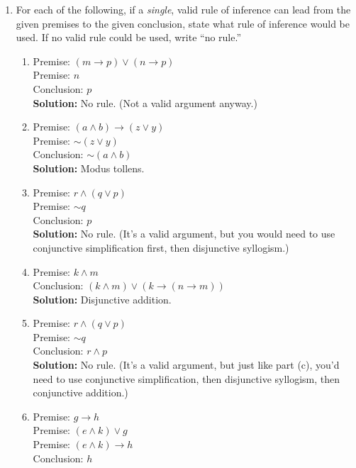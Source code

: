 \documentclass[12pt, letterpaper]{report}
\newcommand{\nott}{{\sim}}
\newcommand{\sol}{\textbf{Solution: }}
\begin{document}
\begin{enumerate}
	
	\item For each of the following, if a \emph{single}, valid rule of inference can lead from the given premises to the given conclusion, state what
	rule of inference would be used. If no valid rule could be used, write ``no rule.''

	\begin{enumerate}
		\item 
		Premise:  $(m \to p) \lor (n \to p)$ \\
		Premise:  $n$ \\
		Conclusion: $p$ \\
		
		\sol No rule. (Not a valid argument anyway.)                  \bigskip

		\item 
		Premise:  $(a \land b) \to (z \lor y)$ \\
		Premise:  $\nott (z \lor y)$ \\
		Conclusion: $\nott (a \land b)$  \\
		
		\sol Modus tollens.

		\item 
		Premise:  $r \land (q \lor p)$ \\
		Premise:  $\nott q$ \\
		Conclusion: $p$  \\
		
		\sol No rule.  (It's a valid argument, but you would need to use conjunctive simplification first, then disjunctive syllogism.)\bigskip
		
		\item 
		Premise:  $k \land m$ \\
		Conclusion: $(k \land m) \lor (k \to (n \to m))$ \\
		
		\sol Disjunctive addition.\bigskip
		
		\item 
		Premise:  $r \land (q \lor p)$ \\
		Premise:  $\nott q$ \\
		Conclusion: $r \land p$ \\
		
		\sol No rule.  (It's a valid argument, but just like part (c), you'd need to use conjunctive simplification, then disjunctive syllogism, then
		conjunctive addition.) \bigskip
		
		\item 
		Premise: $g \to h$\\
		Premise: $(e \land k) \lor g$ \\
		Premise: $(e \land k) \to h$ \\
		Conclusion: $h$
		

\end{enumerate}
\end{enumerate}
\end{document}
